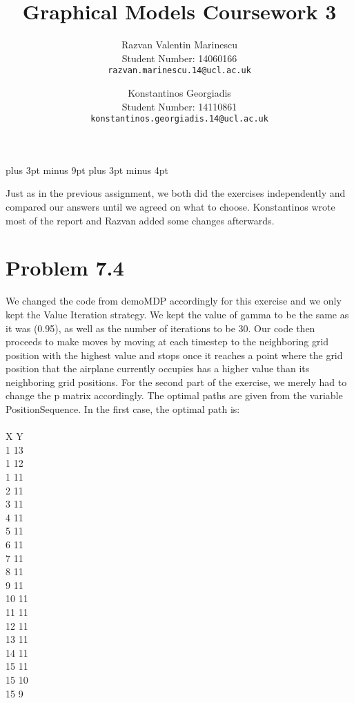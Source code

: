 \documentclass[11pt,a4paper,oneside]{report}
\title{Graphical Models Coursework 3}
\author{
Razvan Valentin Marinescu\\
Student Number: 14060166\\
\texttt{razvan.marinescu.14@ucl.ac.uk}
\and
Konstantinos Georgiadis\\
Student Number: 14110861\\
\texttt{konstantinos.georgiadis.14@ucl.ac.uk}
}
\begin{document}
\belowdisplayskip=12pt plus 3pt minus 9pt
\belowdisplayshortskip=7pt plus 3pt minus 4pt
\maketitle{}

Just as in the previous assignment, we both did the exercises independently and compared our answers until we agreed on what to choose. Konstantinos wrote most of the report and Razvan added some changes afterwards.

\section*{Problem 7.4}

We changed the code from demoMDP accordingly for this exercise and we only kept the Value Iteration strategy. We kept the value of gamma to be the same as it was (0.95), as well as the number of iterations to be 30. Our code then proceeds to make moves by moving at each timestep to the neighboring grid position with the highest value and stops once it reaches a point where the grid position that the airplane currently occupies has a higher value than its neighboring grid positions. For the second part of the exercise, we merely had to change the p matrix accordingly. The optimal paths are given from the variable PositionSequence. In the first case, the optimal path is:\\\\
X Y\\
1     13\\
     1    12\\
     1    11\\
     2    11\\
     3    11\\
     4    11\\
     5    11\\
     6    11\\
     7    11\\
     8    11\\
     9    11\\
    10    11\\
    11    11\\
    12    11\\
    13    11\\
    14    11\\
    15    11\\
    15    10\\
    15     9\\
\end{document}
